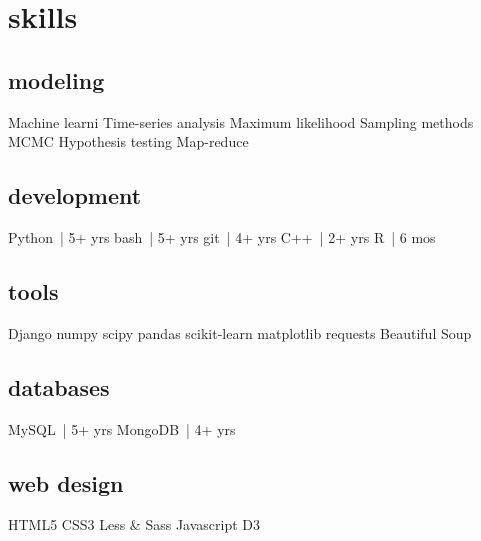 \section{skills}
\subsection{modeling}
Machine learni
Time-series analysis
Maximum likelihood
Sampling methods
MCMC
Hypothesis testing
Map-reduce
~
\subsection{development}
Python~| 5+ yrs
bash~| 5+ yrs
git~| 4+ yrs
C++~| 2+ yrs
R~| 6 mos
~
\subsection{tools}
Django
numpy
scipy
pandas
scikit-learn
matplotlib
requests
Beautiful Soup
~
\subsection{databases}
MySQL~| 5+ yrs
MongoDB~| 4+ yrs
~
\subsection{web design}
HTML5
CSS3
Less \& Sass
Javascript
D3%
